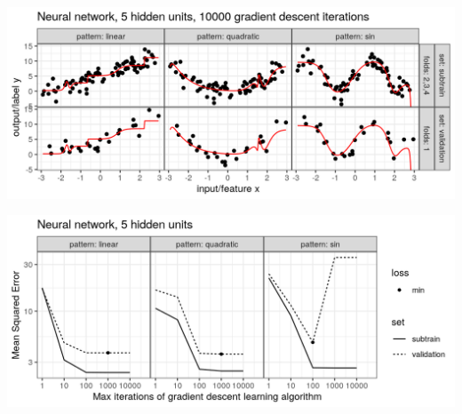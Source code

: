 \begin{frame}
  \includegraphics[width=\textwidth]{figure-overfitting-pred-units=5-maxit=10000.png}
\end{frame}


\begin{frame}
  \includegraphics[width=\textwidth]{figure-overfitting-data-loss-5.png}
\end{frame}

